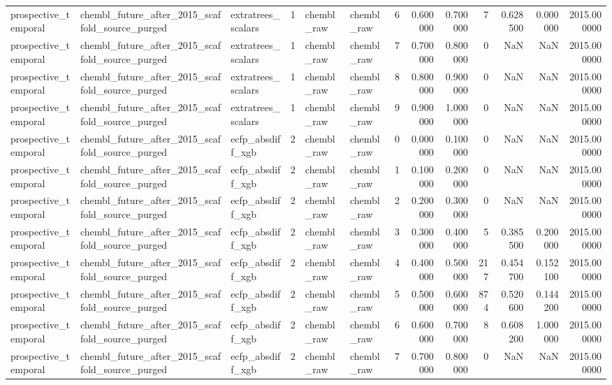 \begin{longtable}{lllrllrrrrrrr}
prospective\_temporal & chembl\_future\_after\_2015\_scaffold\_source\_purged & extratrees\_scalars & 1 & chembl\_raw & chembl\_raw & 6 & 0.600000 & 0.700000 & 7 & 0.628500 & 0.000000 & 2015.000000 \\
prospective\_temporal & chembl\_future\_after\_2015\_scaffold\_source\_purged & extratrees\_scalars & 1 & chembl\_raw & chembl\_raw & 7 & 0.700000 & 0.800000 & 0 & NaN & NaN & 2015.000000 \\
prospective\_temporal & chembl\_future\_after\_2015\_scaffold\_source\_purged & extratrees\_scalars & 1 & chembl\_raw & chembl\_raw & 8 & 0.800000 & 0.900000 & 0 & NaN & NaN & 2015.000000 \\
prospective\_temporal & chembl\_future\_after\_2015\_scaffold\_source\_purged & extratrees\_scalars & 1 & chembl\_raw & chembl\_raw & 9 & 0.900000 & 1.000000 & 0 & NaN & NaN & 2015.000000 \\
prospective\_temporal & chembl\_future\_after\_2015\_scaffold\_source\_purged & ecfp\_absdiff\_xgb & 2 & chembl\_raw & chembl\_raw & 0 & 0.000000 & 0.100000 & 0 & NaN & NaN & 2015.000000 \\
prospective\_temporal & chembl\_future\_after\_2015\_scaffold\_source\_purged & ecfp\_absdiff\_xgb & 2 & chembl\_raw & chembl\_raw & 1 & 0.100000 & 0.200000 & 0 & NaN & NaN & 2015.000000 \\
prospective\_temporal & chembl\_future\_after\_2015\_scaffold\_source\_purged & ecfp\_absdiff\_xgb & 2 & chembl\_raw & chembl\_raw & 2 & 0.200000 & 0.300000 & 0 & NaN & NaN & 2015.000000 \\
prospective\_temporal & chembl\_future\_after\_2015\_scaffold\_source\_purged & ecfp\_absdiff\_xgb & 2 & chembl\_raw & chembl\_raw & 3 & 0.300000 & 0.400000 & 5 & 0.385500 & 0.200000 & 2015.000000 \\
prospective\_temporal & chembl\_future\_after\_2015\_scaffold\_source\_purged & ecfp\_absdiff\_xgb & 2 & chembl\_raw & chembl\_raw & 4 & 0.400000 & 0.500000 & 217 & 0.454700 & 0.152100 & 2015.000000 \\
prospective\_temporal & chembl\_future\_after\_2015\_scaffold\_source\_purged & ecfp\_absdiff\_xgb & 2 & chembl\_raw & chembl\_raw & 5 & 0.500000 & 0.600000 & 874 & 0.520600 & 0.144200 & 2015.000000 \\
prospective\_temporal & chembl\_future\_after\_2015\_scaffold\_source\_purged & ecfp\_absdiff\_xgb & 2 & chembl\_raw & chembl\_raw & 6 & 0.600000 & 0.700000 & 8 & 0.608200 & 1.000000 & 2015.000000 \\
prospective\_temporal & chembl\_future\_after\_2015\_scaffold\_source\_purged & ecfp\_absdiff\_xgb & 2 & chembl\_raw & chembl\_raw & 7 & 0.700000 & 0.800000 & 0 & NaN & NaN & 2015.000000 \\

\end{longtable}
